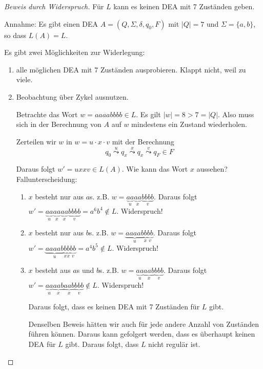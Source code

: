 \documentclass[11pt]{article} %
\theoremstyle{definition}
\begin{document}
\begin{proof}[Beweis durch Widerspruch]
Für $L$ kann es keinen DEA mit 7 Zuständen geben.

Annahme: Es gibt einen DEA $A = (Q, \Sigma, \delta, q_0, F)$ mit $|Q| = 7$ und $\Sigma = \{a,b\}$, so dass $L(A) = L$.

Es gibt zwei Möglichkeiten zur Widerlegung:

\begin{enumerate}
\item alle möglichen DEA mit 7 Zuständen ausprobieren. Klappt nicht, weil zu viele. 
\item Beobachtung über Zykel ausnutzen.

Betrachte das Wort $w = aaaabbbb \in L$. Es gilt $|w| = 8 > 7 = |Q|$. Also muss sich in der Berechnung von $A$ auf $w$ mindestens ein Zustand wiederholen.

Zerteilen wir $w$ in $w = u\cdot x \cdot v$ mit der Berechnung
\[
q_0 \overset{u}{\leadsto}
q_x \overset{x}{\leadsto}
q_x \overset{v}{\leadsto}
q_F \in F
\]

Daraus folgt $w' = uxxv \in L(A)$.
Wie kann das Wort $x$ aussehen? Fallunterscheidung:
\begin{enumerate}
\item $x$ besteht nur aus $a$s. z.B. $w = \underbrace{aa}_u\underbrace{aa}_x \underbrace{bbbb}_v$. Daraus folgt $w' = \underbrace{aa}_u\underbrace{aa}_x \underbrace{aa}_x \underbrace{bbbb}_v = a^6 b^4 \not\in L$. Widerspruch!

\item $x$ besteht nur aus $b$s. z.B. $w = \underbrace{aaaab}_u\underbrace{b}_x \underbrace{bb}_v$. Daraus folgt $w' = \underbrace{aaaab}_u\underbrace{b}_x \underbrace{b}_x \underbrace{bb}_v = a^4 b^5 \not\in L$. Widerspruch!

\item $x$ besteht aus $a$s und $b$s. z.B. $w = \underbrace{aa}_u\underbrace{aab}_x \underbrace{bbb}_v$. Daraus folgt $w' = \underbrace{aa}_u\underbrace{aab}_x \underbrace{aab}_x \underbrace{bbb}_v  \not\in L$. Widerspruch!

Daraus folgt, dass es keinen DEA mit 7 Zuständen für $L$ gibt.

Denselben Beweis hätten wir auch für jede andere Anzahl von Zuständen führen können. Daraus kann gefolgert werden, dass es überhaupt keinen DEA für $L$ gibt. Daraus folgt, dass $L$ nicht regulär ist.
\end{enumerate}

\end{enumerate}
\end{proof}
\end{document}
